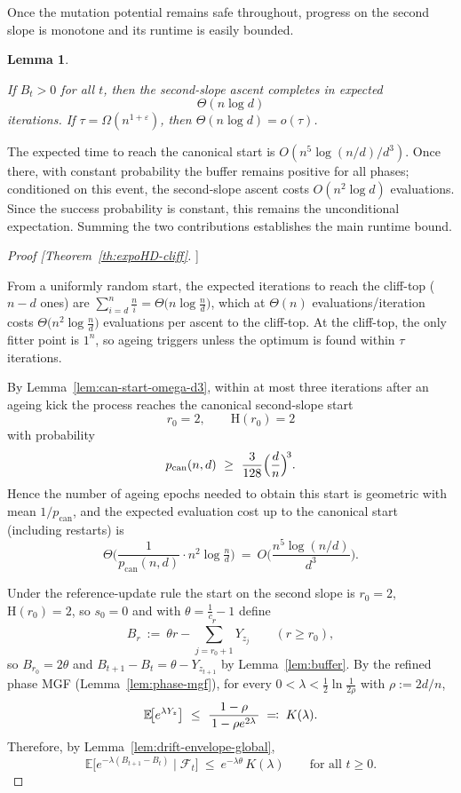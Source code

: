 \documentclass[lettersize,journal]{IEEEtran}
\newcommand{\rerev}[1]{\textcolor{black}{#1}}
\newcommand{\EE}{\mathbb{E}}
\newtheorem{lemma}{Lemma}
\begin{document}
{Once the mutation potential remains safe throughout, progress on the second 
slope is monotone and its runtime is easily bounded.



\begin{lemma}\label{prop:climb-time}
	
	If $B_t>0$ for all $t$, then the second-slope ascent completes in expected
	\[
	\Theta(n\log d)
	\]
	iterations.  
	If $\tau=\Omega(n^{1+\varepsilon})$, then $\Theta(n\log d)=o(\tau)$.
\end{lemma}



The expected time to reach the canonical start is 
$O(n^{5}\log(n/d)/d^{3})$.  
Once there, with constant probability the buffer remains positive for all 
phases; conditioned on this event, the second-slope ascent costs 
$O(n^{2}\log d)$ evaluations.  
Since the success probability is constant, this remains the unconditional 
expectation.  
Summing the two contributions establishes the main runtime bound.

\begin{proof}[Proof [Theorem~\ref{th:expoHD-cliff}]]
	
	From a uniformly random start, the expected iterations to reach the cliff-top ($n-d$ ones) are
	$\sum_{i=d}^{n}\frac{n}{i}=\Theta\!\big(n\log\tfrac{n}{d}\big)$, which at $\Theta(n)$ evaluations/iteration costs
	$\Theta\!\big(n^{2}\log\tfrac{n}{d}\big)$ evaluations per ascent to the cliff-top. At the cliff-top, the only fitter point is $1^n$, so ageing triggers unless the optimum is found within $\tau$ iterations.
	
	By Lemma~\ref{lem:can-start-omega-d3}, within at most three iterations after an ageing kick the process reaches the canonical second-slope start
	\[
	r_0=2,\qquad \text{H}(r_0)=2
	\]
	with probability
	\[
	p_{\mathrm{can}}(n,d)\ \ge\ \rerev{\frac{3}{128}}\Big(\frac{d}{n}\Big)^{\!3}.
	\]
	Hence the number of ageing epochs needed to obtain this start is geometric with mean $1/p_{\mathrm{can}}$, and the expected evaluation cost up to the canonical start (including restarts) is
	\[
	\Theta\!\Big(\frac{1}{p_{\mathrm{can}}(n,d)}\cdot n^{2}\log\tfrac{n}{d}\Big)
	\ =\ O\!\Big(\frac{n^{5}\log(n/d)}{d^{3}}\Big).
	\]
	
	\smallskip
	Under the reference-update rule the start on the second slope is $r_0=2$, $\text{H}(r_0)=2$, so $s_0=0$ and with $\theta=\tfrac1c-1$ define
	\[
	B_r\ :=\ \theta r - \sum_{j=r_0+1}^{r} Y_{z_j}\qquad(r\ge r_0),
	\]
	so $B_{r_0}=2\theta$ and $B_{t+1}-B_t=\theta-Y_{z_{t+1}}$ by Lemma~\ref{lem:buffer}.
	By the refined phase MGF (Lemma~\ref{lem:phase-mgf}), for every $0<\lambda<\tfrac12\ln\!\tfrac{1}{2\rho}$ with $\rho:=2d/n$,
	\[
	\textcolor{black}{\EE\!\big[e^{\lambda Y_z}\big]\ \le\ \frac{1-\rho}{\,1-\rho e^{2\lambda}\,} \;\eqqcolon\; K(\lambda).}
	\]
	Therefore, by Lemma~\ref{lem:drift-envelope-global},
	\[
	\EE\!\big[e^{-\lambda(B_{t+1}-B_t)}\mid\mathcal F_t\big]\ \le\ e^{-\lambda\theta}\,K(\lambda)\qquad\text{for all }t\ge 0.
	\]
	

\end{proof}}
\end{document}
